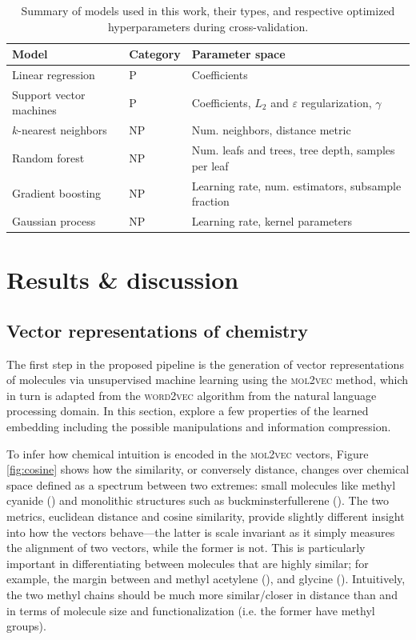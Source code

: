 \documentclass[twocolumn]{aastex63}
\begin{document}
\begin{table}[]
    \centering
    \caption{Summary of models used in this work, their types, and respective optimized hyperparameters during cross-validation.}
    \begin{tabular}{l l l}
        \toprule
        Model & Category & Parameter space \\
        \midrule
        Linear regression & P & Coefficients \\
        Support vector machines & P & Coefficients, $L_2$ and $\varepsilon$ regularization, $\gamma$ \\
        $k$-nearest neighbors & NP & Num. neighbors, distance metric \\
        Random forest & NP & Num. leafs and trees, tree depth, samples per leaf \\
        Gradient boosting & NP & Learning rate, num. estimators, subsample fraction \\
        Gaussian process & NP & Learning rate, kernel parameters \\
        \bottomrule
    \end{tabular}
    \label{tab:model-list}
\end{table}


\section{Results \& discussion}

\subsection{Vector representations of chemistry}

The first step in the proposed pipeline is the generation of vector representations of molecules via unsupervised machine learning using the \textsc{mol2vec} method, which in turn is adapted from the \textsc{word2vec} algorithm from the natural language processing domain. In this section, explore a few properties of the learned embedding including the possible manipulations and information compression.

To infer how chemical intuition is encoded in the \textsc{mol2vec} vectors, Figure \ref{fig:cosine} shows how the similarity, or conversely distance, changes over chemical space defined as a spectrum between two extremes: small molecules like methyl cyanide () and monolithic structures such as buckminsterfullerene (). The two metrics, euclidean distance and cosine similarity, provide slightly different insight into how the vectors behave---the latter is scale invariant as it simply measures the alignment of two vectors, while the former is not. This is particularly important in differentiating between molecules that are highly similar; for example, the margin between  and methyl acetylene (), and glycine (). Intuitively, the two methyl chains should be much more similar/closer in distance than  and  in terms of molecule size and functionalization (i.e. the former have methyl groups). 
\end{document}
